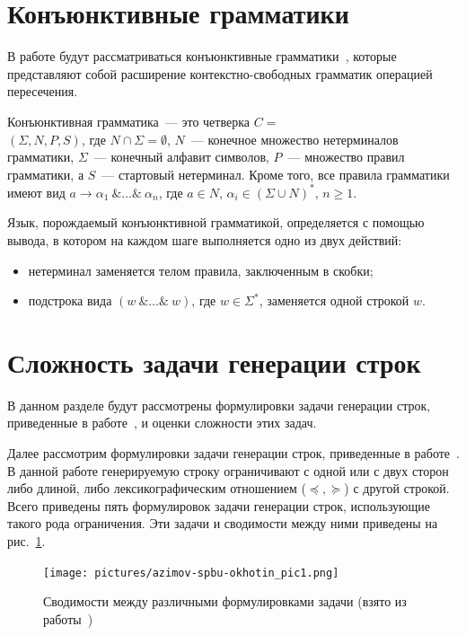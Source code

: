 \section{Конъюнктивные грамматики}
В работе будут рассматриваться конъюнктивные грамматики~\cite{azimov-spbu-conj}, которые представляют собой расширение контекстно-свободных грамматик операцией пересечения.

\begin{mydef}
Конъюнктивная грамматика~--- это четверка $C =$ \\ $(\Sigma, N, P, S)$, где $N \cap \Sigma =  \emptyset$, $N$~--- конечное множество нетерминалов грамматики, $\Sigma$~--- конечный алфавит символов, $P$~--- множество правил грамматики, а $S$~--- стартовый нетерминал. Кроме того, все правила грамматики имеют вид $a \rightarrow \alpha_{1}~\& \ldots \&~\alpha_{n}$, где $a \in N$, $\alpha_{i} \in (\Sigma \cup N)^*$, $n \ge 1$.
\end{mydef}

Язык, порождаемый конъюнктивной грамматикой, определяется с помощью вывода, в котором на каждом шаге выполняется одно из двух действий:
\begin{itemize}
    \item нетерминал заменяется телом правила, заключенным в скобки;
    \item подстрока вида $(w~\& \ldots \&~w)$, где $w \in \Sigma^*$, заменяется одной строкой $w$.
\end{itemize}

\section{Сложность задачи генерации строк}
В данном разделе будут рассмотрены формулировки задачи генерации строк, приведенные в работе~\cite{azimov-spbu-Okhotin}, и оценки сложности этих задач.

Далее рассмотрим формулировки задачи генерации строк, приведенные в работе~\cite{azimov-spbu-Okhotin}. В данной работе генерируемую строку ограничивают с одной или с двух сторон либо длиной, либо лексикографическим отношением ($\preceq, \succeq$) с другой строкой. Всего приведены пять формулировок задачи генерации строк, использующие такого рода ограничения. Эти задачи и сводимости между ними приведены на рис.~\ref{azimov-spbu-tasks}.

\begin{figure}[h!]
 \centering
 \texttt{[image: pictures/azimov-spbu-okhotin\_pic1.png]}
 \caption{Сводимости между различными формулировками задачи (взято из работы~\cite{azimov-spbu-Okhotin})}
 \label{azimov-spbu-tasks}
\end{figure}

